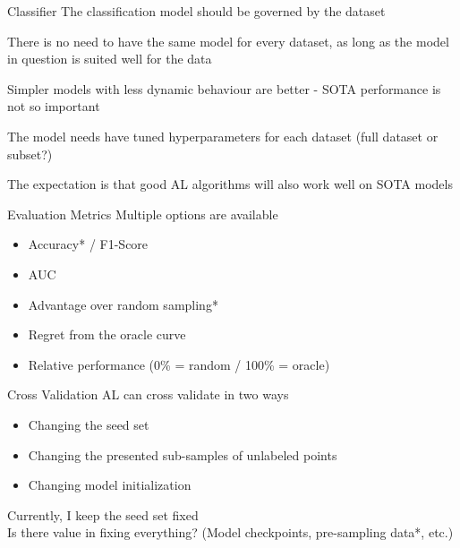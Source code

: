 \documentclass[aspectratio=169, 11pt, invertlogo]{ismll-slides}
\begin{document}

\begin{frame}[fragile]{Classifier}
	The classification model should be governed by the dataset 
	
	There is no need to have the same model for every dataset, as long as the model in question is suited well for the data 
	
	Simpler models with less dynamic behaviour are better - SOTA performance is not so important
	
	The model needs have tuned hyperparameters for each dataset (full dataset or subset?)
	
	The expectation is that good AL algorithms will also work well on SOTA models
\end{frame}


\begin{frame}[fragile]{Evaluation Metrics}
	Multiple options are available
	\begin{itemize}
		\item Accuracy* / F1-Score
		\item AUC
		\item Advantage over random sampling*
		\item Regret from the oracle curve
		\item Relative performance (0\% = random / 100\% = oracle)
	\end{itemize}
\end{frame}


\begin{frame}[fragile]{Cross Validation}
AL can cross validate in two ways
\begin{itemize}
	\item Changing the seed set
	\item Changing the presented sub-samples of unlabeled points
	\item Changing model initialization
\end{itemize}
Currently, I keep the seed set fixed \\ [2mm]
Is there value in fixing everything? (Model checkpoints, pre-sampling data*, etc.)
\end{frame}
\end{document}
